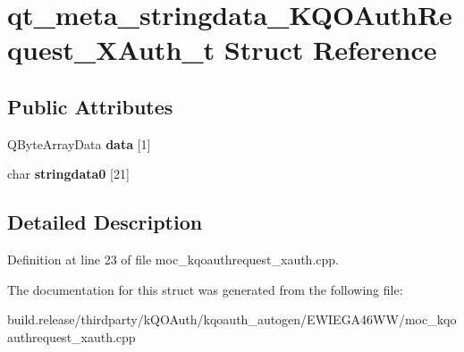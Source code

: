 \hypertarget{structqt__meta__stringdata___k_q_o_auth_request___x_auth__t}{}\section{qt\+\_\+meta\+\_\+stringdata\+\_\+\+K\+Q\+O\+Auth\+Request\+\_\+\+X\+Auth\+\_\+t Struct Reference}
\label{structqt__meta__stringdata___k_q_o_auth_request___x_auth__t}
\subsection*{Public Attributes}
\begin{DoxyCompactItemize}
\item 
\mbox{\label{structqt__meta__stringdata___k_q_o_auth_request___x_auth__t_a5aef0b9636f5e563b156062bb2deb891}} 
Q\+Byte\+Array\+Data {\bfseries data} \mbox{[}1\mbox{]}
\item 
\mbox{\label{structqt__meta__stringdata___k_q_o_auth_request___x_auth__t_a43b27ddb25633e1f7c245c603a0d45fb}} 
char {\bfseries stringdata0} \mbox{[}21\mbox{]}
\end{DoxyCompactItemize}


\subsection{Detailed Description}


Definition at line 23 of file moc\+\_\+kqoauthrequest\+\_\+xauth.\+cpp.



The documentation for this struct was generated from the following file\+:\begin{DoxyCompactItemize}
\item 
build.\+release/thirdparty/k\+Q\+O\+Auth/kqoauth\+\_\+autogen/\+E\+W\+I\+E\+G\+A46\+W\+W/moc\+\_\+kqoauthrequest\+\_\+xauth.\+cpp\end{DoxyCompactItemize}
